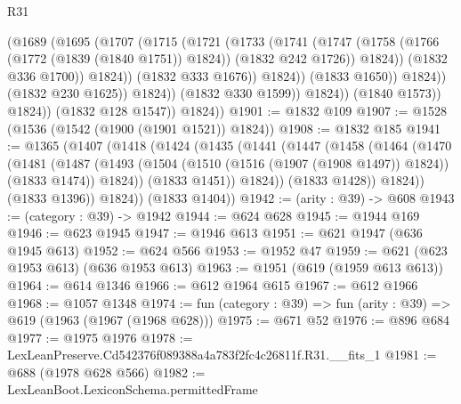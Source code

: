 \begin{lexlean}{R31}
\begin{coremodule}
                                  (@1689
                                    (@1695
                                      (@1707
                                        (@1715
                                          (@1721
                                            (@1733
                                              (@1741
                                                (@1747
                                                  (@1758
                                                    (@1766 (@1772 (@1839 (@1840 @1751)) @1824))
                                                    (@1832 @242 @1726))
                                                  @1824))
                                              (@1832 @336 @1700))
                                            @1824))
                                        (@1832 @333 @1676))
                                      @1824))
                                  (@1833 @1650))
                                @1824))
                            (@1832 @230 @1625))
                          @1824))
                      (@1832 @330 @1599))
                    @1824))
                (@1840 @1573))
              @1824))
          (@1832 @128 @1547))
        @1824))
@1901 := @1832 @109
@1907 := @1528 (@1536 (@1542 (@1900 (@1901 @1521)) @1824))
@1908 := @1832 @185
@1941 := @1365
    (@1407
      (@1418
        (@1424
          (@1435
            (@1441
              (@1447
                (@1458
                  (@1464
                    (@1470
                      (@1481
                        (@1487
                          (@1493
                            (@1504 (@1510 (@1516 (@1907 (@1908 @1497)) @1824)) (@1833 @1474))
                            @1824))
                        (@1833 @1451))
                      @1824))
                  (@1833 @1428))
                @1824))
            (@1833 @1396))
          @1824))
      (@1833 @1404))
@1942 := (arity : @39) -> @608
@1943 := (category : @39) -> @1942
@1944 := @624 @628
@1945 := @1944 @169
@1946 := @623 @1945
@1947 := @1946 @613
@1951 := @621 @1947 (@636 @1945 @613)
@1952 := @624 @566
@1953 := @1952 @47
@1959 := @621 (@623 @1953 @613) (@636 @1953 @613)
@1963 := @1951 (@619 (@1959 @613 @613))
@1964 := @614 @1346
@1966 := @612 @1964 @615
@1967 := @612 @1966
@1968 := @1057 @1348
@1974 := fun (category : @39) => fun (arity : @39) => @619 (@1963 (@1967 (@1968 @628)))
@1975 := @671 @52
@1976 := @896 @684
@1977 := @1975 @1976
@1978 := LexLeanPreserve.Cd542376f089388a4a783f2fc4c26811f.R31.__fits_1
@1981 := @688 (@1978 @628 @566)
@1982 := LexLeanBoot.LexiconSchema.permittedFrame

\end{coremodule}
\end{lexlean}
